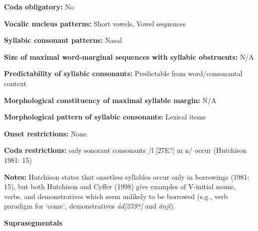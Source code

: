 \begin{styleBody}
\textbf{Coda obligatory:} No
\end{styleBody}

\begin{styleBody}
\textbf{Vocalic nucleus patterns:} Short vowels, Vowel sequences
\end{styleBody}

\begin{styleBody}
\textbf{Syllabic consonant patterns:} Nasal
\end{styleBody}

\begin{styleBody}
\textbf{Size of maximal word{}-marginal sequences with syllabic obstruents:} N/A
\end{styleBody}

\begin{styleBody}
\textbf{Predictability of syllabic consonants:} Predictable from word/consonantal context
\end{styleBody}

\begin{styleBody}
\textbf{Morphological constituency of maximal syllable margin:} N/A
\end{styleBody}

\begin{styleBody}
\textbf{Morphological pattern of syllabic consonants:} Lexical items
\end{styleBody}

\begin{styleBody}
\textbf{Onset restrictions: }None.
\end{styleBody}

\begin{styleBody}
\textbf{Coda restrictions:} only sonorant consonants /l [27E?] m n/ occur (Hutchison 1981: 15)
\end{styleBody}

\begin{styleBody}
\textbf{Notes: }Hutchison states that onsetless syllables occur only in borrowings (1981: 15), but both Hutchison and Cyffer (1998) give examples of V-initial nouns, verbs, and demonstratives which seem unlikely to be borrowed (e.g., verb paradigm for ‘come’, demonstratives \textit{\'{a}d[259?]} and \textit{\'{a}nj\`{i}}).
\end{styleBody}

\begin{styleBody}
\textbf{Suprasegmentals}
\end{styleBody}

